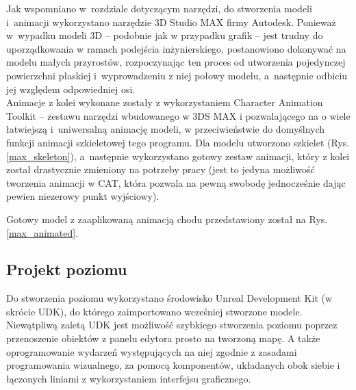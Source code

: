 Jak wspomniano w~rozdziale dotyczącym narzędzi, do stworzenia modeli i~animacji wykorzystano narzędzie 3D Studio MAX firmy Autodesk. Ponieważ w~wypadku modeli 3D -- podobnie jak w przypadku grafik -- jest trudny do uporządkowania w ramach podejścia inżynierskiego, postanowiono dokonywać na modelu małych przyrostów, rozpoczynając ten proces od utworzenia pojedynczej powierzchni płaskiej i~wyprowadzeniu z niej połowy modelu, a~następnie odbiciu jej względem odpowiedniej osi.\\
Animacje z kolei wykonane zostały z wykorzystaniem Character Animation Toolkit -- zestawu narzędzi wbudowanego w 3DS MAX i pozwalającego na o wiele łatwiejszą i~uniwersalną animację modeli, w przeciwieństwie do domyślnych funkcji animacji szkieletowej tego programu. Dla modelu utworzono szkielet (Rys. \ref{max_skeleton}), a~następnie wykorzystano gotowy zestaw animacji, który z kolei został drastycznie zmieniony na potrzeby pracy (jest to jedyna możliwość tworzenia animacji w CAT, która pozwala na pewną swobodę jednocześnie dając pewien niezerowy punkt wyjściowy).

Gotowy model z zaaplikowaną animacją chodu przedstawiony został na Rys. \ref{max_animated}.

\subsection{Projekt poziomu}

Do stworzenia poziomu wykorzystano środowisko Unreal Development Kit (w skrócie UDK), do którego zaimportowano wcześniej stworzone modele. Niewątpliwą zaletą UDK jest możliwość szybkiego stworzenia poziomu poprzez przenoszenie obiektów z panelu edytora prosto na tworzoną mapę. A także oprogramowanie wydarzeń występujących na niej zgodnie z zasadami programowania wizualnego, za pomocą komponentów, układanych obok siebie i łączonych liniami z wykorzystaniem interfejsu graficznego.

